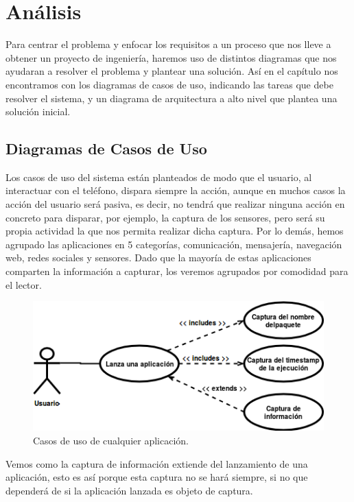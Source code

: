 \documentclass[12pt,a4paper,oneside]{book} %
\begin{document}
\chapter{Análisis}
Para centrar el problema y enfocar los requisitos a un proceso que nos lleve a obtener un proyecto de ingeniería, haremos uso de distintos diagramas que nos ayudaran a resolver el problema y plantear una solución. Así en el capítulo nos encontramos con los diagramas de casos de uso, indicando las tareas que debe resolver el sistema, y un diagrama de arquitectura a alto nivel que plantea una solución inicial. 
\pagebreak
\section{Diagramas de Casos de Uso}
Los casos de uso del sistema están planteados de modo que el usuario, al interactuar con el teléfono, dispara siempre la acción, aunque en muchos casos la acción del usuario será pasiva, es decir, no tendrá que realizar ninguna acción en concreto para disparar, por ejemplo, la captura de los sensores, pero será su propia actividad la que nos permita realizar dicha captura. 
\newline
\newline
Por lo demás, hemos agrupado las aplicaciones en 5 categorías, comunicación, mensajería, navegación web, redes sociales y sensores. Dado que la mayoría de estas aplicaciones comparten la información a capturar, los veremos agrupados por comodidad para el lector. 
\begin{figure}[H]
	\begin{center}
		\includegraphics[scale=0.7]{pictures/usecases/usecases01.png} %
	\end{center}
	\caption[Casos de uso 01]{Casos de uso de cualquier aplicación.}
\end{figure}
Vemos como la captura de información extiende del lanzamiento de una aplicación, esto es así porque esta captura no se hará siempre, si no que dependerá de si la aplicación lanzada es objeto de captura. 
\end{document}
